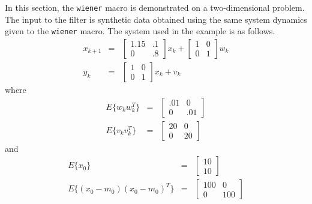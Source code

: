 	In this section, the {\tt wiener} macro is demonstrated on
a two-dimensional problem.  The input to the filter is synthetic
data obtained using the same system dynamics given to the {\tt wiener}
macro.  The system used in the example is as follows.
%
\begin{eqnarray}
x_{k+1}&=&\left[\begin{array}{cc}
              1.15 & .1\\
              0   & .8\end{array}\right]x_k+
         \left[\begin{array}{cc}
              1 & 0\\
              0 & 1\end{array}\right]w_k\nonumber\\
y_k&=&\left[\begin{array}{cc}
              1 & 0\\
              0 & 1\end{array}\right]x_k+v_k\nonumber
\end{eqnarray}
%
where
%
\begin{eqnarray}
E\{w_kw_k^T\}&=&\left[\begin{array}{cc}
              .01 & 0\\
              0 & .01\end{array}\right]\nonumber\\
E\{v_kv_k^T\}&=&\left[\begin{array}{cc}
              20 & 0\\
              0 & 20\end{array}\right]\nonumber
\end{eqnarray}
%
and
%
\begin{eqnarray}
E\{x_0\}&=&\left[\begin{array}{c}
              10\\
              10\end{array}\right]\nonumber\\
E\{(x_0-m_0)(x_0-m_0)^T\}&=&\left[\begin{array}{cc}
              100 & 0\\
              0 & 100\end{array}\right]\nonumber
\end{eqnarray}
%

